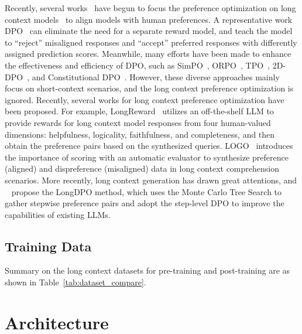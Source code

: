 \documentclass[11pt, a4paper, logo, copyright, nonumbering]{map}
\begin{document}
Recently, several works~\citep{tang2024logo,zhang2024longreward} have begun to focus the preference optimization on long context models~\citep{Rafailov2023DirectPO,Ouyang2022TrainingLM} to align models with human preferences. 
A representative work DPO~\citep{Rafailov2023DirectPO} can eliminate the need for a separate reward model,
and teach the model to ``reject'' misaligned responses and ``accept'' preferred responses with differently assigned prediction scores.
Meanwhile, many efforts have been made to enhance the effectiveness and efficiency of DPO, such as SimPO~\citep{Meng2024SimPOSP}, ORPO~\citep{orpo}, TPO~\citep{saeidi2024triple}, 2D-DPO~\citep{Li20242DDPOSD}, and Constitutional DPO~\citep{wang2024weaver}.
However, these diverse approaches mainly focus on short-context scenarios, and the long context preference optimization is ignored.
Recently, several works for long context preference optimization have been proposed.
For example, 
LongReward~\citep{zhang2024longreward} utilizes an off-the-shelf LLM to provide rewards for long context model responses from four human-valued dimensions: helpfulness, logicality, faithfulness, and completeness,
and then obtain the preference pairs based on the synthesized queries.
LOGO~\citep{Tang2024LOGOL} introduces the importance of scoring with an automatic evaluator to synthesize preference (aligned) and dispreference (misaligned) data in long context comprehension scenarios.
More recently, long context generation has drawn great attentions, and ~\citet{ping2025longdpounlockbetterlongform} propose the LongDPO method, which uses the Monte Carlo Tree Search to gather stepwise preference pairs and adopt the step-level DPO  to improve the capabilities of existing  LLMs.






\subsection{Training Data}
Summary on the long context datasets for pre-training and post-training are as shown in Table~\ref{tab:dataset_compare}.
















\section{Architecture}
\end{document}
